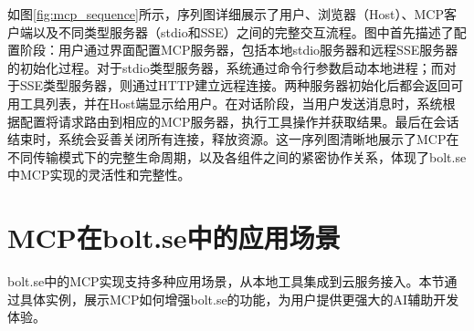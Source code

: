     
    
    
    
    
    


如图\ref{fig:mcp_sequence}所示，序列图详细展示了用户、浏览器（Host）、MCP客户端以及不同类型服务器（stdio和SSE）之间的完整交互流程。图中首先描述了配置阶段：用户通过界面配置MCP服务器，包括本地stdio服务器和远程SSE服务器的初始化过程。对于stdio类型服务器，系统通过命令行参数启动本地进程；而对于SSE类型服务器，则通过HTTP建立远程连接。两种服务器初始化后都会返回可用工具列表，并在Host端显示给用户。在对话阶段，当用户发送消息时，系统根据配置将请求路由到相应的MCP服务器，执行工具操作并获取结果。最后在会话结束时，系统会妥善关闭所有连接，释放资源。这一序列图清晰地展示了MCP在不同传输模式下的完整生命周期，以及各组件之间的紧密协作关系，体现了bolt.se中MCP实现的灵活性和完整性。

\section{MCP在bolt.se中的应用场景}

bolt.se中的MCP实现支持多种应用场景，从本地工具集成到云服务接入。本节通过具体实例，展示MCP如何增强bolt.se的功能，为用户提供更强大的AI辅助开发体验。

